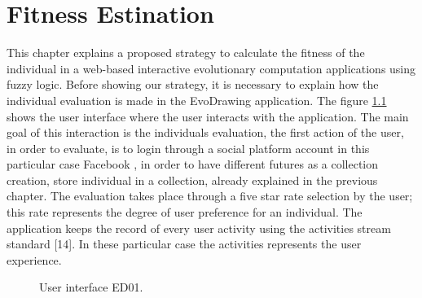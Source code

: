 \chapter{Fitness Estination}

This chapter explains a proposed strategy to calculate the fitness of the
individual in a web-based interactive evolutionary computation applications
using fuzzy logic. Before showing our strategy, it is necessary to explain how
the individual evaluation is made in the EvoDrawing application. The figure
\ref{fig:UI_ED} shows the user interface where the user interacts with the
application. The main goal of this interaction is the individuals evaluation,
the first action of the user, in order to evaluate, is to login through a social
platform account in this particular case Facebook \cite{facebook}, in order to have
different futures as a collection creation, store individual in a collection,
already explained in the previous chapter. The evaluation takes place through a
five star rate selection by the user; this rate represents the degree of user
preference for an individual. The application keeps the record of every user
activity using the activities stream standard [14]. In these particular case the
activities represents the user experience.

\begin{figure}
\captionsetup{justification=centering,margin=2cm}
\centering
\setlength\fboxsep{0pt}
\setlength\fboxrule{0.7pt}
\caption{User interface ED01.}
\label{fig:UI_ED}
\end{figure}

